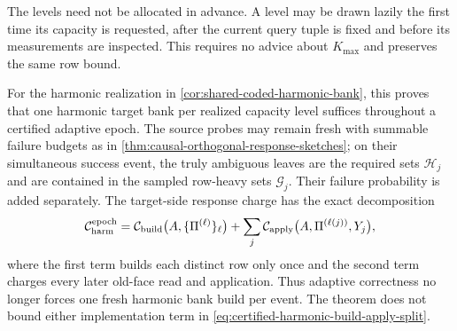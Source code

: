 \begin{theorem}
The levels need not be allocated in advance.  A level may be drawn lazily
the first time its capacity is requested, after the current query tuple is
fixed and before its measurements are inspected.  This requires no advice
about $K_{\max}$ and preserves the same row bound.

For the harmonic realization in
\cref{cor:shared-coded-harmonic-bank}, this proves that one harmonic target
bank per realized capacity level suffices throughout a certified adaptive
epoch.  The source probes may remain fresh with summable failure budgets as in
\cref{thm:causal-orthogonal-response-sketches}; on their simultaneous success
event, the truly ambiguous leaves are the required sets $\mathcal H_j$ and
are contained in the sampled row-heavy sets $\mathcal G_j$.  Their failure
probability is added separately.  The target-side response charge has the
exact decomposition
\begin{equation}
 \mathcal C_{\rm harm}^{\rm epoch}
 =\mathcal C_{\rm build}
   \bigl(A,\{\Pi^{(\ell)}\}_{\ell}\bigr)
  +\sum_j\mathcal C_{\rm apply}
   \bigl(A,\Pi^{(\ell(j))},Y_j\bigr),
 \label{eq:certified-harmonic-build-apply-split}
\end{equation}
where the first term builds each distinct row only once and the second term
charges every later old-face read and application.  Thus adaptive
correctness no longer forces one fresh harmonic bank build per event.  The
theorem does not bound either implementation term in
\cref{eq:certified-harmonic-build-apply-split}.
\end{theorem}

